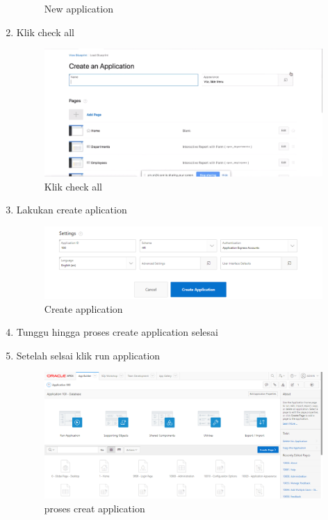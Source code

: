 \begin{enumerate}
\begin{figure}[!htbp]
        \caption{New application}
    \end{figure}
    \item Klik check all
      \begin{figure}[!htbp]
        \centering
        \includegraphics[scale=0.4]{figures/cara7.PNG}
        \caption{Klik check all}
    \end{figure}
    \item Lakukan create aplication
      \begin{figure}[!htbp]
        \centering
        \includegraphics[scale=0.4]{figures/creatapp.PNG}
        \caption{Create application}
    \end{figure}
    \item Tunggu hingga proses create application selesai
    \item Setelah selsai klik run application
      \begin{figure}[!htbp]
        \centering
        \includegraphics[scale=0.4]{figures/run.PNG}
        \caption{proses creat application}

\end{figure}
\end{enumerate}
